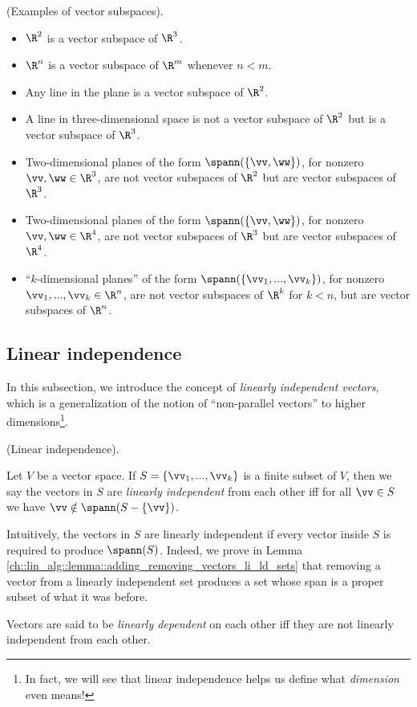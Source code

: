 \begin{remark}
    (Examples of vector subspaces).
    
    \begin{itemize}
        \item $\R^2$ is a vector subspace of $\R^3$.
        \item $\R^n$ is a vector subspace of $\R^m$ whenever $n < m$.
        \item Any line in the plane is a vector subspace of $\R^2$.
        \item A line in three-dimensional space is not a vector subspace of $\R^2$ but is a vector subspace of $\R^3$.
        \item Two-dimensional planes of the form $\spann(\{\vv, \ww\})$, for nonzero $\vv, \ww \in \R^3$, are not vector subspaces of $\R^2$ but are vector subspaces of $\R^3$.
        \item Two-dimensional planes of the form $\spann(\{\vv, \ww\})$, for nonzero $\vv, \ww \in \R^4$, are not vector subspaces of $\R^3$ but are vector subspaces of $\R^4$.
        \item ``$k$-dimensional planes'' of the form $\spann(\{\vv_1, ..., \vv_k\})$, for nonzero $\vv_1, ..., \vv_k \in \R^n$, are not vector subspaces of $\R^k$ for $k < n$, but are vector subspaces of $\R^n$.
    \end{itemize}
\end{remark}

\newpage

\subsection*{Linear independence}

In this subsection, we introduce the concept of \textit{linearly independent vectors}, which is a generalization of the notion of ``non-parallel vectors'' to higher dimensions\footnote{In fact, we will see that linear independence helps us define what \textit{dimension} even means!}.

\begin{defn}
    (Linear independence).
    
    Let $V$ be a vector space. If $S = \{\vv_1, ..., \vv_k\}$ is a finite subset of $V$, then we say the vectors in $S$ are \textit{linearly independent} from each other iff for all $\vv \in S$ we have $\vv \notin \spann(S - \{\vv\})$.
    
    Intuitively, the vectors in $S$ are linearly independent if every vector inside $S$ is required to produce $\spann(S)$. Indeed, we prove in Lemma \ref{ch::lin_alg::lemma::adding_removing_vectors_li_ld_sets} that removing a vector from a linearly independent set produces a set whose span is a proper subset of what it was before.
    
    Vectors are said to be \textit{linearly dependent} on each other iff they are not linearly independent from each other.
\end{defn}

